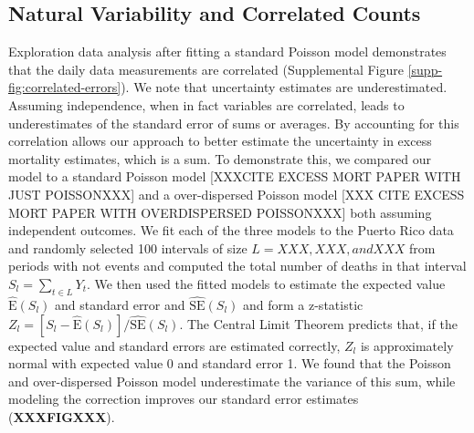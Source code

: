 \documentclass[11pt]{article}
\begin{document}
\subsection{Natural Variability and Correlated Counts}
\label{subsec:natural-variability}
Exploration data analysis after fitting a standard Poisson model demonstrates that the daily data measurements are correlated (Supplemental Figure \ref{supp-fig:correlated-errors}). We note that uncertainty estimates are underestimated. Assuming independence, when in fact variables are correlated, leads to underestimates of the standard error of sums or averages. By accounting for this correlation allows our approach to better estimate the uncertainty in excess mortality estimates, which is a sum. To demonstrate this, we compared our model to a standard Poisson model [XXXCITE EXCESS MORT PAPER WITH JUST POISSONXXX] and a over-dispersed Poisson model [XXX CITE EXCESS MORT PAPER WITH OVERDISPERSED POISSONXXX] both assuming independent outcomes. We fit each of the three models to the Puerto Rico data and randomly selected 100 intervals of size $L = XXX, XXX, and XXX$ from periods with not events and computed the total number of deaths in that interval $S_l = \sum_{t \in L} Y_t$. We then used the fitted models to estimate the expected value $\hat{\mbox{E}}(S_l)$ and standard error  and $\hat{\mbox{SE}}(S_l)$ and form a z-statistic $Z_l = [S_l - \hat{\mbox{E}}(S_l)]/\hat{\mbox{SE}}(S_l)$. The Central Limit Theorem predicts that, if the expected value and standard errors are estimated correctly, $Z_l$ is approximately normal with expected value 0 and standard error 1. We found that the Poisson and over-dispersed Poisson model underestimate the variance of this sum, while modeling the correction improves our standard error estimates (\textbf{XXXFIGXXX}). 
\end{document}
